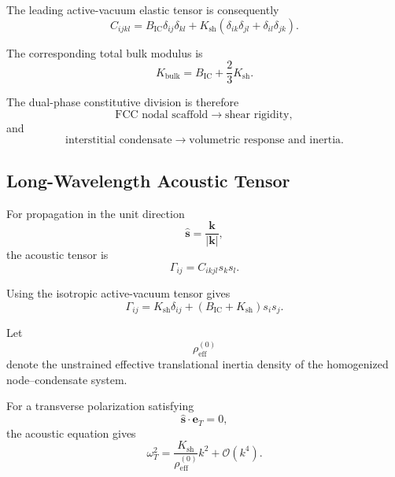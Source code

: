 The leading active-vacuum elastic tensor is consequently
\begin{equation}
    \boxed{ C_{ijkl} = B_{\mathrm{IC}} \delta_{ij}\delta_{kl} + K_{\mathrm{sh}} \left( \delta_{ik}\delta_{jl} + \delta_{il}\delta_{jk} \right). }
\end{equation}

The corresponding total bulk modulus is
\begin{equation}
    \boxed{ K_{\mathrm{bulk}} = B_{\mathrm{IC}} + \frac{2}{3}K_{\mathrm{sh}}. }
\end{equation}

The dual-phase constitutive division is therefore
\begin{equation}
    \boxed{ \text{FCC nodal scaffold} \longrightarrow \text{shear rigidity}, }
\end{equation}
and
\begin{equation}
    \boxed{ \text{interstitial condensate} \longrightarrow \text{volumetric response and inertia}. }
\end{equation}

\subsection{Long-Wavelength Acoustic Tensor}

For propagation in the unit direction
\begin{equation}
    \hat{\mathbf{s}} = \frac{\mathbf{k}}{|\mathbf{k}|},
\end{equation}
the acoustic tensor is
\begin{equation}
    \Gamma_{ij} = C_{ikjl}s_k s_l.
\end{equation}

Using the isotropic active-vacuum tensor gives
\begin{equation}
    \boxed{ \Gamma_{ij} = K_{\mathrm{sh}}\delta_{ij} + \left( B_{\mathrm{IC}} + K_{\mathrm{sh}} \right) s_i s_j. }
\end{equation}

Let
\begin{equation}
    \rho_{\mathrm{eff}}^{(0)}
\end{equation}
denote the unstrained effective translational inertia density of the homogenized node--condensate system.

For a transverse polarization satisfying
\begin{equation}
    \hat{\mathbf{s}}\cdot\mathbf{e}_T = 0,
\end{equation}
the acoustic equation gives
\begin{equation}
    \omega_T^2 = \frac{ K_{\mathrm{sh}} }{ \rho_{\mathrm{eff}}^{(0)} } k^2 + \mathcal{O}(k^4).
\end{equation}

